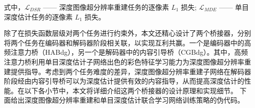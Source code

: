 \noindent 式中，$\mathcal{L}_{DSR}$ —— 深度图像超分辨率重建任务的逐像素 $L_1$ 损失;\newline
\indent\quad $\mathcal{L}_{MDE}$ —— 单目深度估计任务的逐像素 $L_1$ 损失。

除了在损失函数层级对两个任务进行约束外，本文还精心设计了两个桥接器，分别将两个任务在编码器和解码器阶段相关联，以实现互利共赢。一个是编码器中的高频注意力桥（HABdg），另一个是解码器中的内容引导桥（CGBdg）。其中，高频注意力桥利用单目深度估计子网络出色的彩色特征学习能力为深度图像超分辨率重建提供指导。考虑到两个任务难度的差异，深度图像超分辨率重建子网络在解码器阶段经由内容引导桥可以为深度估计提供有效的内容指导，从而提高深度估计的性能。在以下各小节中，本文将详细介绍这两个桥接器的设计原理和实现细节。
下面给出深度图像超分辨率重建和单目深度估计联合学习网络训练策略的伪代码。

%       
